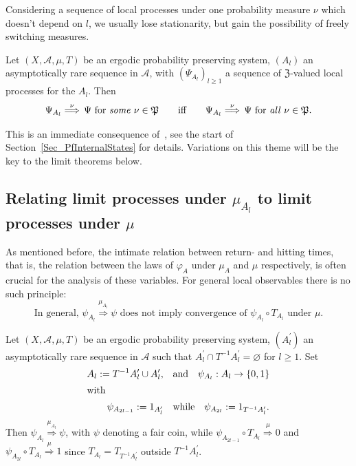 \documentclass[AHL,Unicode,longabstracts]{cedram}
\newcommand{\clA}{\mathcal{A}}
\newcommand{\frkP}{\mathfrak{P}}
\newcommand{\frkZ}{\mathfrak{Z}}
\begin{document}
Considering a sequence of local processes under one probability measure $\nu$ which doesn't depend on $l$, we usually lose stationarity, but gain the possibility of freely switching measures.

\begin{prop}\label{P_SDCInternal}
Let $(X,\clA,\mu,T)$ be an ergodic probability preserving system, $(A_{l})$ an asymptotically rare sequence in $\clA$, with $(\Psi_{A_{l}})_{l\geq1}$ a sequence of $\frkZ$-valued local processes for the $A_{l}$. Then
\begin{equation}
\Psi_{A_{l}}\overset{\nu}{\Longrightarrow}\,\Psi\text{ for \emph{some} }\nu
\in\frkP\qquad \text{iff}\qquad\Psi_{A_{l}}\overset{\nu} {\Longrightarrow}\,\Psi\text{ for \emph{all} }\nu\in\frkP.
\end{equation}
\end{prop}

This is an immediate consequence of~\cite{Z7}, see the start of Section~\ref{Sec_PfInternalStates} for details. Variations on this theme will be the key to the limit theorems below.


\subsection{Relating limit processes under $\mu_{A_{l}}$ to limit processes under $\mu$}
As mentioned before, the intimate relation between return- and hitting times, that is, the relation between the laws of $\varphi_{A}$ under $\mu_{A}$ and $\mu$ respectively, is often crucial for the analysis of these variables. For general local observables there is no such principle:
\begin{equation} \label{Eq_AWarningLocObs}
\text{In general, }\psi_{A_{l}}\overset{\mu_{A_{l}}}{\Longrightarrow}
\psi\text{ does not imply convergence of }\psi_{A_{l}}\circ T_{A_{l}}\text{ under }\mu.
\end{equation}


\begin{exam}
Let $(X,\clA,\mu,T)$ be an ergodic probability preserving system, $(A_{l}^{\prime})$ an asymptotically rare sequence in $\clA$ such that $A_{l}^{\prime}\cap T^{-1}A_{l}^{\prime}=\varnothing$ for $l\geq1$. Set 
\begin{align*}
A_{l}:= T^{-1}A_{l}^{\prime}\cup A_{l}^{\prime}, \quad &\text{and}\quad\psi_{A_{l}} :A_{l}\rightarrow\{0,1\}\\
\intertext{with}
\psi_{A_{2l-1}}:= 1_{A_{l}^{\prime}}\quad &\text{while}\quad\psi_{A_{2l}}:=1_{T^{-1}A_{l}^{\prime}}.
\end{align*}
Then $\psi_{A_{l}}\overset {\mu_{A_{l}}}{\Longrightarrow}\psi$, with $\psi$ denoting a fair coin, while $\psi_{A_{2l-1}}\circ T_{A_{l}}\overset{\mu}{\Longrightarrow}0$ and $\psi_{A_{2l}}\circ T_{A_{l}}\overset{\mu}{\Longrightarrow}1$ since $T_{A_{l} }=T_{T^{-1}A_{l}^{\prime}}$ outside $T^{-1}A_{l}^{\prime}$.
\end{exam}
\end{document}
